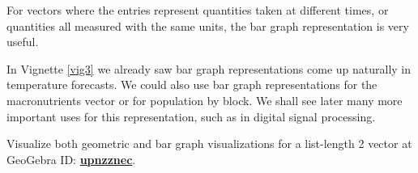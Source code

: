 For vectors where the entries represent quantities taken at different times, or quantities all measured with the same units, the bar graph representation is very useful. 

In Vignette \ref{vig3} we already saw bar graph representations come up naturally in temperature forecasts. 
We could also use bar graph representations for the macronutrients vector or for population by block.
We shall see later many more important uses for this representation, such as in digital signal processing.


\begin{geogebra_link}
Visualize both geometric and bar graph visualizations for a list-length 2 vector at GeoGebra ID:
\href{https://www.geogebra.org/m/upnzznec}{\textbf{upnzznec}}.
\end{geogebra_link}


\newpage
{} %

